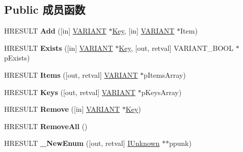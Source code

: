 \subsection*{Public 成员函数}
\begin{DoxyCompactItemize}
\item 
\mbox{\label{interface_scripting_1_1_i_dictionary_a99bd2e111fcfb80145d4d676270f6656}} 
H\+R\+E\+S\+U\+LT {\bfseries Add} (\mbox{[}in\mbox{]} \hyperlink{structtag_v_a_r_i_a_n_t}{V\+A\+R\+I\+A\+NT} $\ast$\hyperlink{struct_key}{Key}, \mbox{[}in\mbox{]} \hyperlink{structtag_v_a_r_i_a_n_t}{V\+A\+R\+I\+A\+NT} $\ast$Item)
\item 
\mbox{\label{interface_scripting_1_1_i_dictionary_ada1e50c0b4da1122022ddac6fb9a0f4b}} 
H\+R\+E\+S\+U\+LT {\bfseries Exists} (\mbox{[}in\mbox{]} \hyperlink{structtag_v_a_r_i_a_n_t}{V\+A\+R\+I\+A\+NT} $\ast$\hyperlink{struct_key}{Key}, \mbox{[}out, retval\mbox{]} V\+A\+R\+I\+A\+N\+T\+\_\+\+B\+O\+OL $\ast$p\+Exists)
\item 
\mbox{\label{interface_scripting_1_1_i_dictionary_ae06259f123e52baa64d3a1443316336f}} 
H\+R\+E\+S\+U\+LT {\bfseries Items} (\mbox{[}out, retval\mbox{]} \hyperlink{structtag_v_a_r_i_a_n_t}{V\+A\+R\+I\+A\+NT} $\ast$p\+Items\+Array)
\item 
\mbox{\label{interface_scripting_1_1_i_dictionary_a575aad2ab5703f754b63a021a777af80}} 
H\+R\+E\+S\+U\+LT {\bfseries Keys} (\mbox{[}out, retval\mbox{]} \hyperlink{structtag_v_a_r_i_a_n_t}{V\+A\+R\+I\+A\+NT} $\ast$p\+Keys\+Array)
\item 
\mbox{\label{interface_scripting_1_1_i_dictionary_a141b0bbec4f49f00b616affd18c0bc99}} 
H\+R\+E\+S\+U\+LT {\bfseries Remove} (\mbox{[}in\mbox{]} \hyperlink{structtag_v_a_r_i_a_n_t}{V\+A\+R\+I\+A\+NT} $\ast$\hyperlink{struct_key}{Key})
\item 
\mbox{\label{interface_scripting_1_1_i_dictionary_a576e5b4c88d310326e44046fdee5612d}} 
H\+R\+E\+S\+U\+LT {\bfseries Remove\+All} ()
\item 
\mbox{\label{interface_scripting_1_1_i_dictionary_aa8f6f39a8a361195b24dd0eb41d42cf3}} 
H\+R\+E\+S\+U\+LT {\bfseries \+\_\+\+New\+Enum} (\mbox{[}out, retval\mbox{]} \hyperlink{interface_i_unknown}{I\+Unknown} $\ast$$\ast$ppunk)
\end{DoxyCompactItemize}
